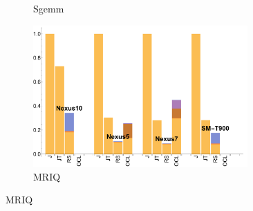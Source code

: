 \begin{figure}
\begin{subfigure}[b]{0.33\textwidth}
      \caption{Sgemm}
  \end{subfigure}
  \begin{subfigure}[b]{0.33\textwidth}
      \centering
      \includegraphics[width=0.9\textwidth]{data/Mriq_onecompute_time.pdf}
      \caption{MRIQ}
  \end{subfigure}


\end{figure}
